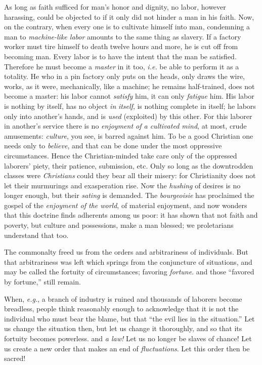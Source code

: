 As long as faith sufficed for man's honor and dignity, no labor, however 
harassing, could be objected to if it only did not hinder a man in his faith. 
Now, on the contrary, when every one is to cultivate himself into man, 
condemning a man to \textit{machine-like labor} amounts to the same thing as 
slavery. If a factory worker must tire himself to death twelve hours and more, 
he is cut off from becoming man. Every labor is to have the intent that the 
man be satisfied. Therefore he must become a \textit{master} in it too, 
\textit{i.e.} be able to perform it as a totality. He who in a pin factory 
only puts on the heads, only draws the wire, works, as it were, mechanically, 
like a machine; he remains half-trained, does not become a master: his labor 
cannot \textit{satisfy} him, it can only \textit{fatigue} him. His labor is 
nothing by itself, has no object \textit{in} \textit{itself}, is nothing 
complete in itself; he labors only into another's hands, and is \textit{used} 
(exploited) by this other. For this laborer in another's service there is no 
\textit{enjoyment of a cultivated mind}, at most, crude amusements: 
\textit{culture}, you see, is barred against him. To be a good Christian one 
needs only to \textit{believe}, and that can be done under the most oppressive 
circumstances. Hence the Christian-minded take care only of the oppressed 
laborers' piety, their patience, submission, etc. Only so long as the 
downtrodden classes were \textit{Christians} could they bear all their misery: 
for Christianity does not let their murmurings and exasperation rise. Now the 
\textit{hushing} of desires is no longer enough, but their \textit{sating} is 
demanded. The \textit{bourgeoisie} has proclaimed the gospel of the 
\textit{enjoyment of the world}, of material enjoyment, and now wonders that 
this doctrine finds adherents among us poor: it has shown that not faith and 
poverty, but culture and possessions, make a man blessed; we proletarians 
understand that too.

The commonalty freed us from the orders and arbitrariness of individuals. But 
that arbitrariness was left which springs from the conjuncture of situations, 
and may be called the fortuity of circumstances; favoring \textit{fortune}. 
and those ``favored by fortune,'' still remain.

When, \textit{e.g.}, a branch of industry is ruined and thousands of laborers 
become breadless, people think reasonably enough to acknowledge that it is not 
the individual who must bear the blame, but that ``the evil lies in the 
situation.'' Let us change the situation then, but let us change it 
thoroughly, and so that its fortuity becomes powerless. and \textit{a law!} 
Let us no longer be slaves of chance! Let us create a new order that makes an 
end of \textit{fluctuations}. Let this order then be sacred!

